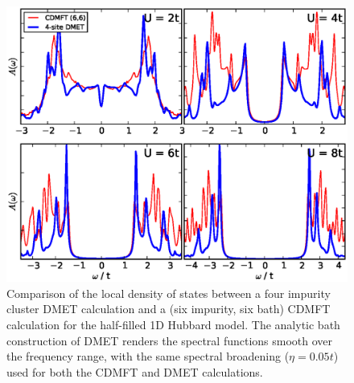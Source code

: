 \documentclass[aps,twocolumn,nobibnotes]{revtex4}
\begin{document}
\begin{figure}
\begin{center}
    \vspace{-2mm}
\includegraphics[scale=0.425]{Plots/1D_Spectra/1D_Hub_Spectra.eps}
\end{center}
    \vspace{-5mm}
\caption{Comparison of the local density of states between a four impurity cluster DMET calculation and a
(six impurity, six bath) CDMFT calculation for the half-filled 1D Hubbard model. The analytic bath construction
of DMET renders the spectral functions smooth over the frequency range, with the same spectral broadening ($\eta=0.05t$) used for
both the CDMFT and DMET calculations.}
\label{1D_DOS}
\end{figure}
\end{document}
